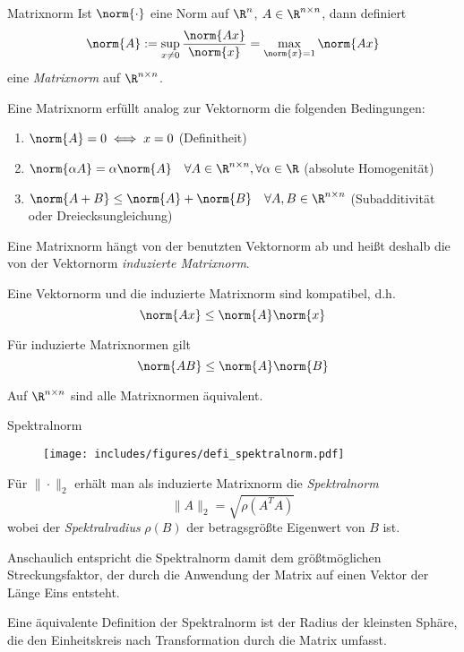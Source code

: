 \begin{defi}{Matrixnorm}
    Ist $\norm{\cdot}$ eine Norm auf $\R^n$, $A \in \R^{n \times n}$, dann definiert
    \[
        \norm{A} := \sup_{x \neq 0} \frac{\norm{Ax}}{\norm{x}} = \max_{\norm{x} = 1} \norm{Ax}
    \]
    eine \emph{Matrixnorm} auf $\R^{n \times n}$.

    Eine Matrixnorm erfüllt analog zur Vektornorm die folgenden Bedingungen:
    \begin{enumerate}
        \item $\norm{A} = 0 \iff x = 0$ (Definitheit)
        \item $\norm{\alpha A} = \alpha \norm{A} \quad \forall A \in \R^{n \times n}, \forall \alpha \in \R$ (absolute Homogenität)
        \item $\norm{A + B} \leq \norm{A} + \norm{B} \quad \forall A, B \in \R^{n \times n}$ (Subadditivität oder Dreiecksungleichung)
    \end{enumerate}

    Eine Matrixnorm hängt von der benutzten Vektornorm ab und heißt deshalb die von der Vektornorm \emph{induzierte Matrixnorm}.

    Eine Vektornorm und die induzierte Matrixnorm sind kompatibel, d.h.
    \[
        \norm{Ax} \leq \norm{A} \norm{x}
    \]

    Für induzierte Matrixnormen gilt
    \[
        \norm{AB} \leq \norm{A} \norm{B}
    \]

    Auf $\R^{n \times n}$ sind alle Matrixnormen äquivalent.
\end{defi}

\begin{defi}{Spektralnorm}
    \begin{wrapfigure}{r}{0.4\textwidth}
        \texttt{[image: includes/figures/defi\_spektralnorm.pdf]}
    \end{wrapfigure}
    Für $\| \cdot \|_2$ erhält man als induzierte Matrixnorm die \emph{Spektralnorm}
    \[
        \| A \|_2 = \sqrt{\rho (A^TA)}
    \]
    wobei der \emph{Spektralradius} $\rho(B)$ der betragsgrößte Eigenwert von $B$ ist.

    Anschaulich entspricht die Spektralnorm damit dem größtmöglichen Streckungsfaktor, der durch die Anwendung der Matrix auf einen Vektor der Länge Eins entsteht.

    Eine äquivalente Definition der Spektralnorm ist der Radius der kleinsten Sphäre, die den Einheitskreis nach Transformation durch die Matrix umfasst.
\end{defi}

